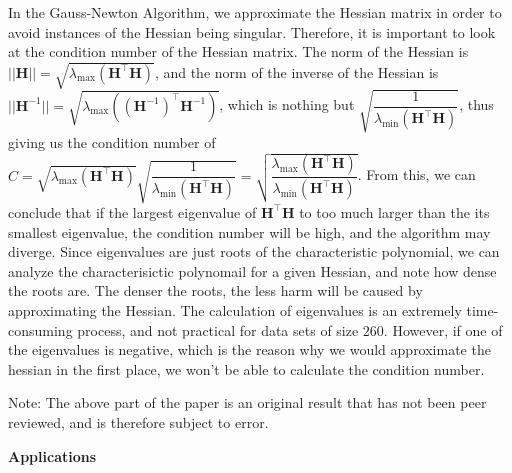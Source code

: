 \documentclass[12pt]{article}
\begin{document}
\vskip 0.2cm 

In the Gauss-Newton Algorithm, we approximate the Hessian matrix in order to avoid instances of the Hessian being singular. Therefore, it is important to look at the condition number of the Hessian matrix. The norm of the Hessian is  $||\mathbf{H}|| = \sqrt{\lambda_\text{max}(\mathbf{H}^\top\mathbf{H})}$, and the norm of the inverse of the Hessian is $||\mathbf{H}^{-1}|| = \sqrt{\lambda_\text{max}((\mathbf{H}^{-1})^\top\mathbf{H}^{-1})}$, which is nothing but $\sqrt{\dfrac{1}{\lambda_\text{min}(\mathbf{H}^\top\mathbf{H})}}$, thus giving us the condition number of $C = \sqrt{\lambda_\text{max}(\mathbf{H}^\top\mathbf{H})}  \sqrt{\dfrac{1}{\lambda_\text{min}(\mathbf{H}^\top\mathbf{H})}} = \sqrt{\dfrac{\lambda_\text{max}(\mathbf{H}^\top\mathbf{H})}{\lambda_\text{min}(\mathbf{H}^\top\mathbf{H})}}$. 
From this, we can conclude that if the largest eigenvalue of $\mathbf{H}^\top\mathbf{H}$ to too much larger than the its smallest eigenvalue, the condition number will be high, and the algorithm may diverge. Since eigenvalues are just roots of the characteristic polynomial, we can analyze the characterisictic polynomail for a given Hessian, and note how dense the roots are. The denser the roots, the less harm will be caused by approximating the Hessian. The calculation of eigenvalues is an extremely time-consuming process, and not practical for data sets of size $260$. However, if one of the eigenvalues is negative, which is the reason why we would approximate the hessian in the first place, we won't be able to calculate the condition number. 

\vskip 0.2cm Note: The above part of the paper is an original result that has not been peer reviewed, and is therefore subject to error. 

\vskip 1cm

\begin{center}

\textbf{Applications}

\end{center}
\end{document}
